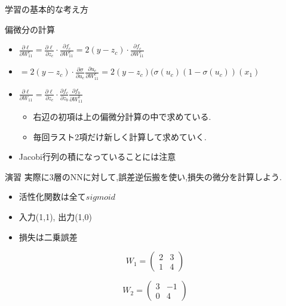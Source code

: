 \begin{frame}[fragile]{学習の基本的な考え方}
\begin{frame}[fragile]{偏微分の計算}
\begin{itemize}
\item $\frac{\partial \ell}{\partial W^c_{11}} =  \frac{\partial \ell}{\partial z_c}\cdot \frac{\partial f_c}{\partial W^c_{11}}= 2(y - z_c) \cdot \frac{\partial f_c}{\partial W^c_{11}}$
\item $ = 2(y- z_c) \cdot \frac{\partial \sigma}{\partial u_c} \frac{\partial u_c}{\partial W^c_{11}} = 2(y-z_c)(\sigma(u_c)(1 - \sigma(u_c))(x_1)$
\item $\frac{\partial \ell}{\partial W_{11}} =  \frac{\partial \ell}{\partial z_c}\cdot  \frac{\partial f_c}{\partial z_b}\frac{\partial f_b}{\partial W^b_{11}}$
  \begin{itemize}
  \item 右辺の初項は上の偏微分計算の中で求めている.
  \item 毎回ラスト2項だけ新しく計算して求めていく.
  \end{itemize}
\item Jacobi行列の積になっていることには注意
\end{itemize}
\end{frame}


\begin{frame}[fragile]{演習}
実際に3層のNNに対して,誤差逆伝搬を使い,損失の微分を計算しよう.
\begin{itemize}
\item 活性化関数は全て$sigmoid$
\item 入力(1,1), 出力(1,0)
\item 損失は二乗誤差
\end{itemize}
\begin{equation*}
W_1 = \begin{pmatrix}
2 & 3 \\
1 & 4 
\end{pmatrix}
\end{equation*}

\begin{equation*}
W_2 = \begin{pmatrix}
3 & -1 \\
0 & 4 
\end{pmatrix}
\end{equation*}
\end{frame}


\end{frame}
